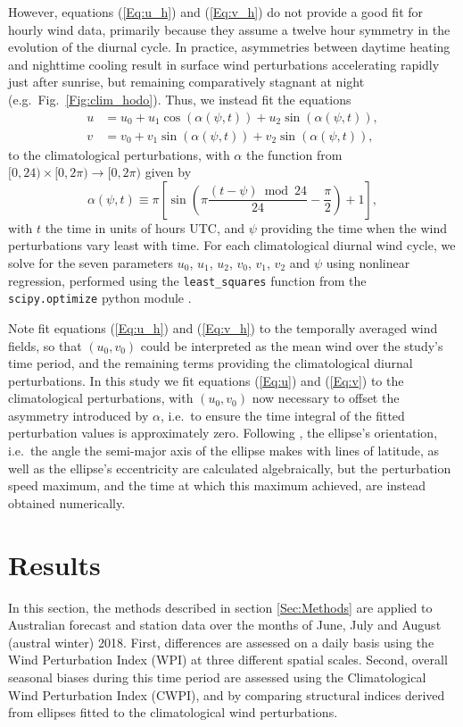 \documentclass{ametsoc}
\begin{document}
However, equations (\ref{Eq:u_h}) and (\ref{Eq:v_h}) do not provide a good fit for hourly wind data, primarily because they assume a twelve hour symmetry in the evolution of the diurnal cycle. In practice, asymmetries between daytime heating and nighttime cooling \citep[e.g.][]{svensson11} result in surface wind perturbations accelerating rapidly just after sunrise, but remaining comparatively stagnant at night (e.g.~Fig.~\ref{Fig:clim_hodo}). Thus, we instead fit the equations
\begin{align}
u &= u_0 + u_1 \cos(\alpha(\psi,t)) + u_2 \sin(\alpha(\psi,t)), \label{Eq:u} \\
v &= v_0 + v_1 \sin(\alpha(\psi,t)) + v_2 \sin(\alpha(\psi,t)), \label{Eq:v}
\end{align}
to the climatological perturbations, with $\alpha$ the function from $[0,24) \times [0, 2\pi) \to [0, 2\pi)$ given by
\begin{equation}
\alpha(\psi,t) \equiv \pi \left[\sin\left( \pi \frac{(t - \psi)  \bmod 24}{24} - \frac{\pi}{2} \right) + 1 \right], \label{Eq:alpha}
\end{equation}
with $t$ the time in units of hours UTC, and $\psi$ providing the time when the wind perturbations vary least with time. For each climatological diurnal wind cycle, we solve for the seven parameters $u_0$, $u_1$, $u_2$, $v_0$, $v_1$, $v_2$ and $\psi$ using nonlinear regression, performed using the \texttt{least\_squares} function from the \texttt{scipy.optimize} python module \citep{scipy19}.

Note \citet{gille05} fit equations (\ref{Eq:u_h}) and (\ref{Eq:v_h}) to the temporally averaged wind fields, so that $\left(u_0, v_0\right)$ could be interpreted as the mean wind over the study's time period, and the remaining terms providing the climatological diurnal perturbations. In this study we fit equations (\ref{Eq:u}) and (\ref{Eq:v}) to the climatological perturbations, with $\left(u_0, v_0\right)$ now necessary to offset the asymmetry introduced by $\alpha$, i.e.~to ensure the time integral of the fitted perturbation values is approximately zero. Following \citet{gille05}, the ellipse's orientation, i.e.~the angle the semi-major axis of the ellipse makes with lines of latitude, as well as the ellipse's eccentricity are calculated algebraically, but the perturbation speed maximum, and the time at which this maximum achieved, are instead obtained numerically.

\section{Results}
\label{Sec:Results}
In this section, the methods described in section \ref{Sec:Methods} are applied to Australian forecast and station data over the months of June, July and August (austral winter) 2018. First, differences are assessed on a daily basis using the Wind Perturbation Index (WPI) at three different spatial scales. Second, overall seasonal biases during this time period are assessed using the Climatological Wind Perturbation Index (CWPI), and by comparing structural indices derived from ellipses fitted to the climatological wind perturbations. 
\end{document}
